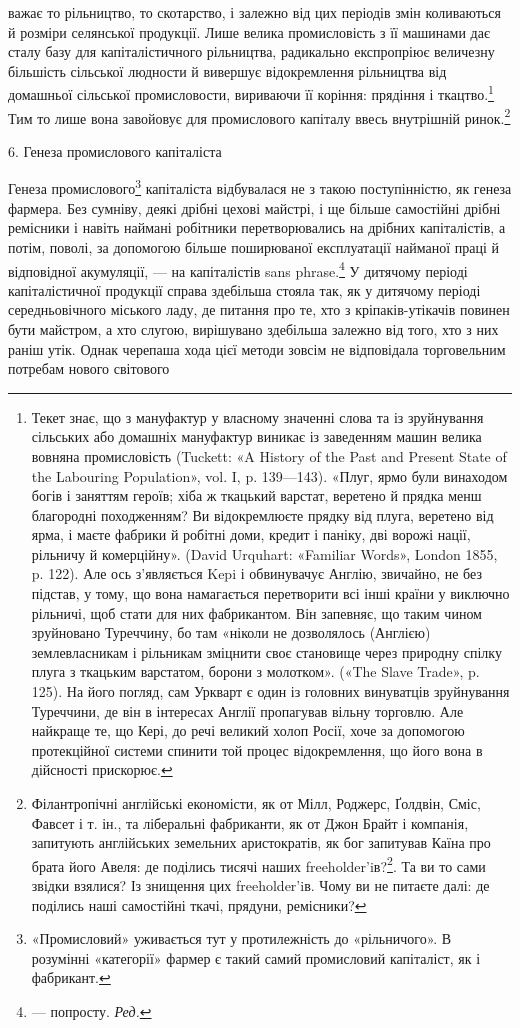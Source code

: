 важає то рільництво, то скотарство, і залежно від цих періодів
змін коливаються й розміри селянської продукції. Лише велика
промисловість з її машинами дає сталу базу для капіталістичного
рільництва, радикально експропріює величезну більшість сільської
людности й вивершує відокремлення рільництва від домашньої
сільської промисловости, вириваючи її коріння: прядіння
і ткацтво.\footnote{
Текет знає, що з мануфактур у власному значенні слова та із
зруйнування сільських або домашніх мануфактур виникає із заведенням
машин велика вовняна промисловість (Tuckett: «A History of the Past
and Present State of the Labouring Population», vol. I, p. 139—143).
«Плуг, ярмо були винаходом богів і заняттям героїв; хіба ж ткацький
варстат, веретено й прядка менш благородні походженням? Ви відокремлюєте
прядку від плуга, веретено від ярма, і маєте фабрики й робітні
доми, кредит і паніку, дві ворожі нації, рільничу й комерційну».
(David Urquhart: «Familiar Words», London 1855, p. 122). Але ось з’являється
Kepi і обвинувачує Англію, звичайно, не без підстав, у тому,
що вона намагається перетворити всі інші країни у виключно рільничі,
щоб стати для них фабрикантом. Він запевняє, що таким чином зруйновано
Туреччину, бо там «ніколи не дозволялось (Англією) землевласникам
і рільникам зміцнити своє становище через природну спілку плуга
з ткацьким варстатом, борони з молотком». («The Slave Trade», p. 125).
На його погляд, сам Уркварт є один із головних винуватців зруйнування
Туреччини, де він в інтересах Англії пропагував вільну торговлю.
Але найкраще те, що Кері, до речі великий холоп Росії, хоче за допомогою
протекційної системи спинити той процес відокремлення, що його вона
в дійсності прискорює.
} Тим то лише вона завойовує для промислового
капіталу ввесь внутрішній ринок.\footnote{
Філантропічні англійські економісти, як от Мілл, Роджерс, Ґолдвін,
Сміс, Фавсет і т. ін., та ліберальні фабриканти, як от Джон Брайт
і компанія, запитують англійських земельних аристократів, як бог
запитував Каїна про брата його Авеля: де поділись тисячі наших freeholder’iв?\footnote*{
— самостійних селян. \emph{Ред.}
}.
Та ви то сами звідки взялися? Із знищення цих freeholder’iв.
Чому ви не питаєте далі: де поділись наші самостійні ткачі, прядуни,
ремісники?
}

6. Генеза промислового капіталіста

Генеза промислового\footnote{
«Промисловий» уживається тут у протилежність до «рільничого».
В розумінні «категорії» фармер є такий самий промисловий капіталіст,
як і фабрикант.
} капіталіста відбувалася не з такою
поступінністю, як генеза фармера. Без сумніву, деякі дрібні
цехові майстрі, і ще більше самостійні дрібні ремісники і навіть
наймані робітники перетворювались на дрібних капіталістів,
а потім, поволі, за допомогою більше поширюваної експлуатації
найманої праці й відповідної акумуляції, — на капіталістів sans
phrase.\footnote*{
— попросту. \emph{Ред.}
} У дитячому періоді капіталістичної продукції справа
здебільша стояла так, як у дитячому періоді середньовічного
міського ладу, де питання про те, хто з кріпаків-утікачів повинен
бути майстром, а хто слугою, вирішувано здебільша залежно
від того, хто з них раніш утік. Однак черепаша хода цієї методи
зовсім не відповідала торговельним потребам нового світового